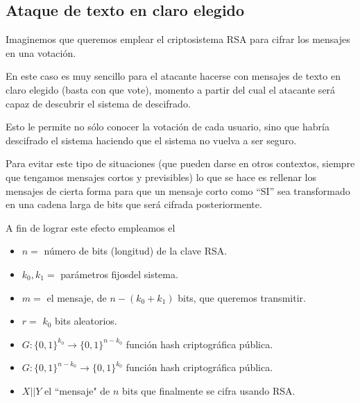 \subsection{Ataque de texto en claro elegido}
Imaginemos que queremos emplear el criptosistema RSA para cifrar los mensajes en una votación.

En este caso es muy sencillo para el atacante hacerse con mensajes de texto en claro elegido (basta con que vote), momento a partir del cual el atacante será capaz de descubrir el sistema de descifrado.

Esto le permite no sólo conocer la votación de cada usuario, sino que habría descifrado el sistema haciendo que el sistema no vuelva a ser seguro.

Para evitar este tipo de situaciones (que pueden darse en otros contextos, siempre que tengamos mensajes cortos y previsibles) lo que se hace es rellenar los mensajes de cierta forma para que un mensaje corto como ``SI'' sea transformado en una cadena larga de bits que será cifrada posteriormente.


A fin de lograr este efecto empleamos el 

\begin{itemize}
\item $n=$ número de bits (longitud) de la clave RSA.
\item $k_0, k_1=$ parámetros fijosdel sistema.
\item $m=$ el mensaje, de $n-(k_0+k_1)$ bits, que queremos transmitir.
\item $r=$ $k_0$ bits aleatorios.
\item $G:\{0,1\}^{k_0}\longrightarrow \{0,1\}^{n-k_0}$ función hash criptográfica pública.
\item $G:\{0,1\}^{n-k_0}\longrightarrow \{0,1\}^{k_0}$ función hash criptográfica pública.
\item $X||Y$ el ``mensaje" de $n$ bits que finalmente se cifra usando RSA.
\end{itemize}

